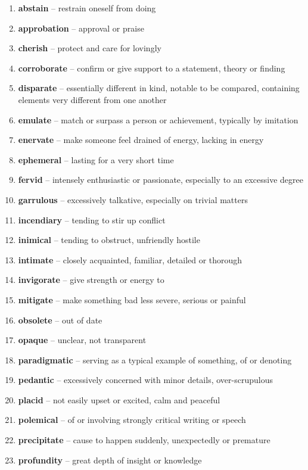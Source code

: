 \begin{enumerate}[wide,labelindent=0pt]
\item \textbf{abstain} -- restrain oneself from doing
\item \textbf{approbation} -- approval or praise
\item \textbf{cherish} -- protect and care for lovingly
\item \textbf{corroborate} -- confirm or give support to a statement, theory or finding
\item \textbf{disparate} -- essentially different in kind, notable to be compared, containing elements very different from one another
\item \textbf{emulate} -- match or surpass a person or achievement, typically by imitation
\item \textbf{enervate} -- make someone feel drained of energy, lacking in energy
\item \textbf{ephemeral} -- lasting for a very short time
\item \textbf{fervid} -- intensely enthusiastic or passionate, especially to an excessive degree
\item \textbf{garrulous} -- excessively talkative, especially on trivial matters
\item \textbf{incendiary} -- tending to stir up conflict
\item \textbf{inimical} -- tending to obstruct, unfriendly hostile
\item \textbf{intimate} -- closely acquainted, familiar, detailed or thorough
\item \textbf{invigorate} -- give strength or energy to
\item \textbf{mitigate} -- make something bad less severe, serious or painful
\item \textbf{obsolete} -- out of date
\item \textbf{opaque} -- unclear, not transparent
\item \textbf{paradigmatic} -- serving as a typical example of something, of or denoting
\item \textbf{pedantic} -- excessively concerned with minor details, over-scrupulous
\item \textbf{placid} -- not easily upset or excited, calm and peaceful
\item \textbf{polemical} -- of or involving strongly critical writing or speech
\item \textbf{precipitate} -- cause to happen suddenly, unexpectedly or premature
\item \textbf{profundity} -- great depth of insight or knowledge

\end{enumerate}
